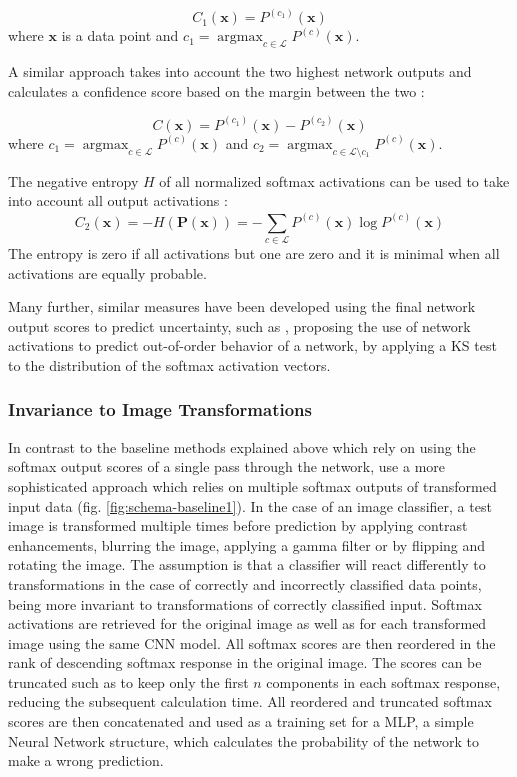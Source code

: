 \documentclass[10pt]{article}
\DeclareMathOperator{\argmax}{argmax}
\begin{document}
\begin{equation}
	\label{eq:net_msr}
    C_1(\mathbf{x})=P^{(c_1)}(\mathbf{x})
\end{equation}
where $\mathbf{x}$ is a data point and $c_1=\argmax_{c\in\mathcal{L}}P^{(c)}(\mathbf{x})$.

A similar approach takes into account the two highest network outputs and calculates a confidence score based on the margin between the two \cite{ouerghemmi_two-step_2017, mandelbaum17}:

\begin{equation}
	\label{eq:net_margin}
    C(\mathbf{x})=P^{(c_1)}(\mathbf{x})-P^{(c_2)}(\mathbf{x})
\end{equation}
where $c_1=\argmax_{c\in\mathcal{L}}P^{(c)}(\mathbf{x})$ and $c_2=\argmax_{c\in\mathcal{L}\setminus c_1}P^{(c)}(\mathbf{x})$.

The negative entropy $H$ of all normalized softmax activations can be used to take into account all output activations \cite{zaragoza}:
\begin{equation}
    \label{eq:net_entropy}
    C_2(\mathbf{x}) = -H(\mathbf{P(\mathbf{x})}) = -\sum_{c\in \mathcal{L}}^{}P^{(c)}(\mathbf{x})\log P^{(c)}(\mathbf{x})
\end{equation}
The entropy is zero if all activations but one are zero and it is minimal when all activations are equally probable.

Many further, similar measures have been developed using the final network output scores to predict uncertainty, such as \textcite{Sun2018KSconfA}, proposing the use of network activations to predict out-of-order behavior of a network, by applying a \gls{KS} test to the distribution of the softmax activation vectors.

\subsubsection{Invariance to Image Transformations}
In contrast to the baseline methods explained above which rely on using the softmax output scores of a single pass through the network, \textcite{Bahat_2018} use a more sophisticated approach which relies on multiple softmax outputs of transformed input data (fig. \ref{fig:schema-baseline1}). In the case of an image classifier, a test image is transformed multiple times before prediction by applying contrast enhancements, blurring the image, applying a gamma filter or by flipping and rotating the image. The assumption is that a classifier will react differently to transformations in the case of correctly and incorrectly classified data points, being more invariant to transformations of correctly classified input. Softmax activations are retrieved for the original image as well as for each transformed image using the same \gls{CNN} model. All softmax scores are then reordered in the rank of descending softmax response in the original image. The scores can be truncated such as to keep only the first $n$ components in each softmax response, reducing the subsequent calculation time. All reordered and truncated softmax scores are then concatenated and used as a training set for a \gls{MLP}, a simple Neural Network structure, which calculates the probability of the network to make a wrong prediction.
\end{document}
